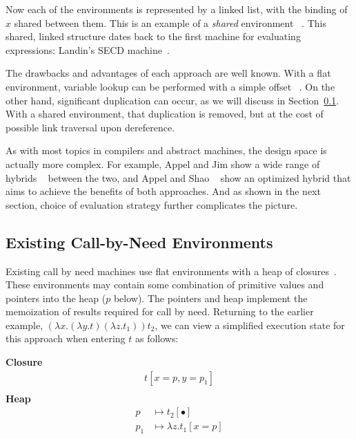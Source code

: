 \begin{center}
\end{center}
Now each of the environments is represented by a linked list, with the binding
of $x$ shared between them. This is an example of a \emph{shared} environment
~\cite{appel1988optimizing}. This shared, linked structure dates back to the 
first machine for evaluating expressions: Landin's SECD
machine~\cite{landin1964mechanical}.

The drawbacks and advantages of each approach are well known. With a flat
environment, variable lookup can be performed with a simple offset
~\cite{jonesstg,appel2006compiling}. On the other hand, significant
duplication can occur, as we will discuss in Section~\ref{sec:exist}.
With a shared environment, that duplication is removed, but at the cost of
possible link traversal upon dereference. 

As with most topics in compilers and abstract machines, the design space is
actually more complex. For example, Appel and Jim show a wide range of hybrids
~\cite{appel1988optimizing} between the two, and Appel and Shao
~\cite{shao1994space} show an optimized hybrid that aims to achieve the benefits
of both approaches. And as shown in the next section, choice of evaluation
strategy further complicates the picture.

\subsection{Existing Call-by-Need Environments} \label{sec:exist}

Existing call by need machines use flat environments with a heap of
closures~\cite{jonesstg,TIM,johnsson1984efficient,boquist1997grin}. These
environments may contain some combination of primitive values and pointers into the
heap ($p$ below). The pointers and heap implement the memoization of results
required for call by need. Returning to the earlier example, $(\lambda
x.(\lambda y.t) (\lambda z.t_1)) t_2$, we can view a simplified execution state
for this approach when entering $t$ as follows:

\begin{center}
\textbf{Closure}
\begin{align*}
t[x=p, y=p_1] \\
\end{align*}
\textbf{Heap}
\begin{align*}
p &\mapsto t_2[\bullet] \\
p_1 &\mapsto \lambda z.t_1[x=p] 
\end{align*}
\end{center}

